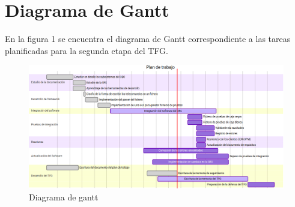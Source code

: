 
\section{Diagrama de Gantt}
En la figura 1 se encuentra el diagrama de Gantt
correspondiente a las tareas planificadas para la segunda etapa del TFG.
\begin{figure}[h]
  \label{fig:diagrama}
  \hspace*{-1.75cm}%
  \includegraphics[scale=0.45]{fig/gantt.png}
  \hspace*{-3cm}%
  \caption{Diagrama de gantt}
\end{figure}
